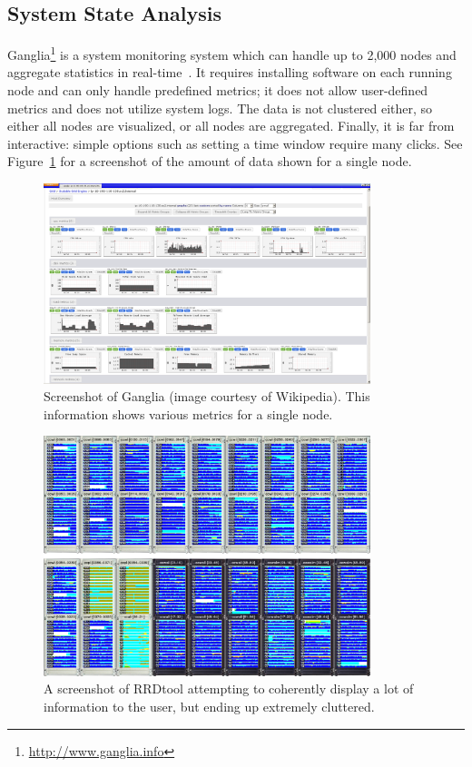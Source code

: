 \documentclass[conference]{style/acmsiggraph}
\begin{document}
\subsection{System State Analysis}
Ganglia\footnote{\url{http://www.ganglia.info}} is a system monitoring system which can handle up to 2,000 nodes and aggregate statistics in real-time~\cite{Massie04}.
It requires installing software on each running node and can only handle predefined metrics; it does not allow user-defined metrics and does not utilize system logs.
The data is not clustered either, so either all nodes are visualized, or all nodes are aggregated.
Finally, it is far from interactive: simple options such as setting a time window require many clicks.
See Figure~\ref{fig:ganglia} for a screenshot of the amount of data shown for a single node.

\begin{figure}[p]
    \centering
    \includegraphics[width=0.85\textwidth]{images/ganglia.png}
    \caption{Screenshot of Ganglia (image courtesy of Wikipedia). This information shows various metrics for a single node.}
    \label{fig:ganglia}
\end{figure}

\begin{figure}[p]
    \centering
    \includegraphics[width=0.85\textwidth]{images/rrdtool.png}
    \caption{A screenshot of RRDtool attempting to coherently display a lot of information to the user, but ending up extremely cluttered.\protect\footnotemark}
    \label{fig:rrdtool}
\end{figure}
\end{document}
